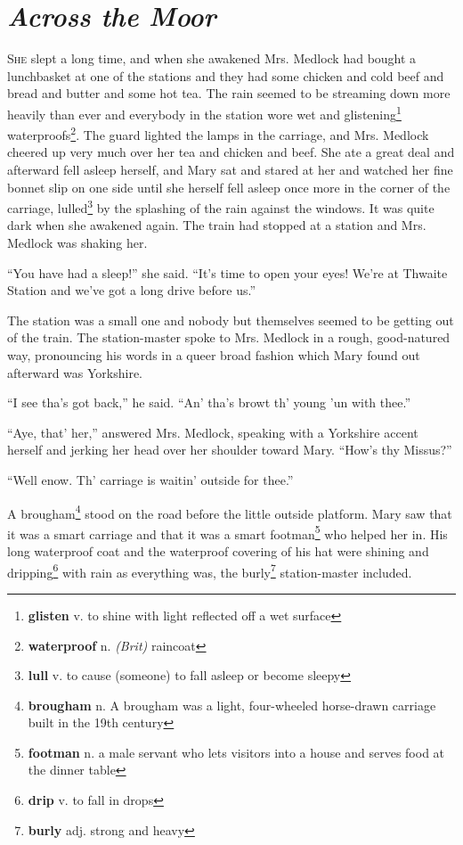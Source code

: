 \chapter{\textit{Across the Moor}}
\lettrine{S}{he} slept a long time, and when she awakened Mrs. Medlock had bought a lunchbasket at one of the stations and they had some chicken and cold beef and bread and butter and some hot tea. The rain seemed to be streaming down more heavily than ever and everybody in the station wore wet and glistening\footnote{\textbf{glisten} v. to shine with light reflected off a wet surface} waterproofs\footnote{\textbf{waterproof} n. \textit{(Brit)} raincoat}. The guard lighted the lamps in the carriage, and Mrs. Medlock cheered up very much over her tea and chicken and beef. She ate a great deal and afterward fell asleep herself, and Mary sat and stared at her and watched her fine bonnet slip on one side until she herself fell asleep once more in the corner of the carriage, lulled\footnote{\textbf{lull} v. to cause (someone) to fall asleep or become sleepy} by the splashing of the rain against the windows. It was quite dark when she awakened again. The train had stopped at a station and Mrs. Medlock was shaking her.

``You have had a sleep!'' she said. ``It's time to open your eyes! We're at Thwaite Station and we've got a long drive before us.''

The station was a small one and nobody but themselves seemed to be getting out of the train. The station-master spoke to Mrs. Medlock in a rough, good-natured way, pronouncing his words in a queer broad fashion which Mary found out afterward was Yorkshire.

``I see tha's got back,'' he said. ``An' tha's browt th' young 'un with thee.''

``Aye, that' her,'' answered Mrs. Medlock, speaking with a Yorkshire accent herself and jerking her head over her shoulder toward Mary. ``How's thy Missus?''

``Well enow. Th' carriage is waitin' outside for thee.''

A brougham\footnote{\textbf{brougham} n. A brougham was a light, four-wheeled horse-drawn carriage built in the 19th century} stood on the road before the little outside platform. Mary saw that it was a smart carriage and that it was a smart footman\footnote{\textbf{footman} n. a male servant who lets visitors into a house and serves food at the dinner table} who helped her in. His long waterproof coat and the waterproof covering of his hat were shining and dripping\footnote{\textbf{drip} v. to fall in drops} with rain as everything was, the burly\footnote{\textbf{burly} adj. strong and heavy} station-master included.

